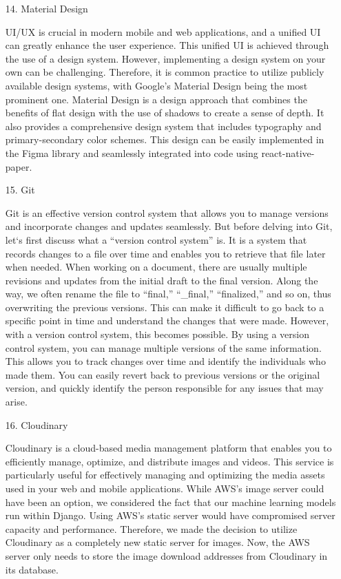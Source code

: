 \documentclass[conference, a4paper]{IEEEtran}
\begin{document}
\begin{enumerate}
\begin{enumerate}
        \item[14.]Material Design \cite{google-material-design}
        \item[]UI/UX is crucial in modern mobile and web applications, and a unified UI can greatly enhance the user experience. This unified UI is achieved through the use of a design system. However, implementing a design system on your own can be challenging. Therefore, it is common practice to utilize publicly available design systems, with Google's Material Design being the most prominent one. Material Design is a design approach that combines the benefits of flat design with the use of shadows to create a sense of depth. It also provides a comprehensive design system that includes typography and primary-secondary color schemes. This design can be easily implemented in the Figma library and seamlessly integrated into code using react-native-paper. \\

        \item[15.]Git \cite{velog-git}
        \item[]Git is an effective version control system that allows you to manage versions and incorporate changes and updates seamlessly. But before delving into Git, let`s first discuss what a ``version control system'' is. It is a system that records changes to a file over time and enables you to retrieve that file later when needed. When working on a document, there are usually multiple revisions and updates from the initial draft to the final version. Along the way, we often rename the file to ``final,'' ``\_final,'' ``finalized,'' and so on, thus overwriting the previous versions. This can make it difficult to go back to a specific point in time and understand the changes that were made. However, with a version control system, this becomes possible. By using a version control system, you can manage multiple versions of the same information. This allows you to track changes over time and identify the individuals who made them. You can easily revert back to previous versions or the original version, and quickly identify the person responsible for any issues that may arise.\\

        \item[16.]Cloudinary 
        \item[]Cloudinary is a cloud-based media management platform that enables you to efficiently manage, optimize, and distribute images and videos. This service is particularly useful for effectively managing and optimizing the media assets used in your web and mobile applications. While AWS's image server could have been an option, we considered the fact that our machine learning models run within Django. Using AWS's static server would have compromised server capacity and performance. Therefore, we made the decision to utilize Cloudinary as a completely new static server for images. Now, the AWS server only needs to store the image download addresses from Cloudinary in its database.\\
    \end{enumerate}
\end{enumerate}
\end{document}
